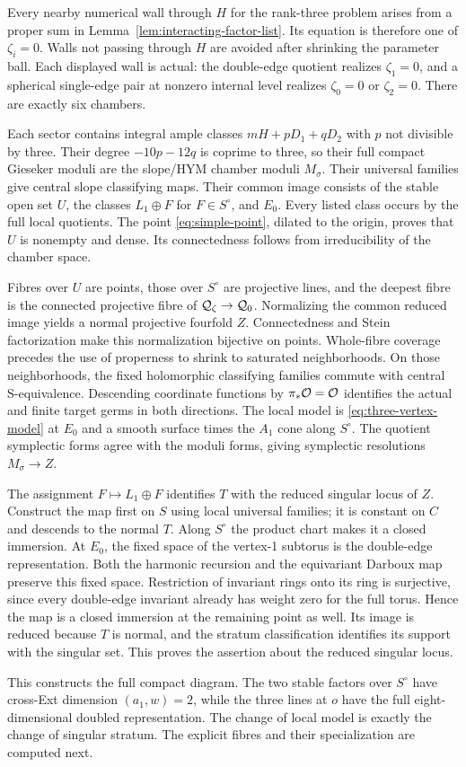 Every nearby numerical wall through $H$ for
the rank-three problem arises from a proper
sum in Lemma~\ref{lem:interacting-factor-list}.
Its equation is therefore one of
$\zeta_i=0$. Walls not passing through $H$
are avoided after shrinking the parameter
ball. Each displayed wall is actual: the
double-edge quotient realizes $\zeta_1=0$,
and a spherical single-edge pair at nonzero
internal level realizes $\zeta_0=0$ or
$\zeta_2=0$. There are exactly six chambers.

Each sector contains integral ample classes
$mH+pD_1+qD_2$ with $p$ not divisible by
three. Their degree $-10p-12q$ is coprime
to three, so their full compact Gieseker
moduli are the slope/HYM chamber moduli
$M_\sigma$. Their universal families give
central slope classifying maps. Their common
image consists of the stable open set $U$,
the classes $L_1\oplus F$ for
$F\in S^\circ$, and $E_0$. Every listed
class occurs by the full local quotients.
The point \eqref{eq:simple-point}, dilated
to the origin, proves that $U$ is nonempty
and dense. Its connectedness follows from
irreducibility of the chamber space.

Fibres over $U$ are points, those over
$S^\circ$ are projective lines, and the
deepest fibre is the connected projective
fibre of $\mathcal Q_\zeta\to\mathcal Q_0$. Normalizing
the common reduced image yields a normal
projective fourfold $Z$. Connectedness and
Stein factorization make this normalization
bijective on points. Whole-fibre coverage
precedes the use of properness to shrink to
saturated neighborhoods. On those neighborhoods,
the fixed holomorphic classifying families
commute with central S-equivalence. Descending
coordinate functions by $\pi_*\mathcal O=\mathcal O$
identifies the actual and finite target
germs in both directions. The local model
is \eqref{eq:three-vertex-model} at $E_0$
and a smooth surface times the $A_1$ cone
along $S^\circ$. The quotient symplectic
forms agree with the moduli forms, giving
symplectic resolutions $M_\sigma\to Z$.

The assignment $F\mapsto L_1\oplus F$
identifies $T$ with the reduced singular
locus of $Z$. Construct the map first on $S$
using local universal families; it is
constant on $C$ and descends to the normal
$T$. Along $S^\circ$ the product chart
makes it a closed immersion. At $E_0$, the
fixed space of the vertex-1 subtorus is
the double-edge representation. Both the
harmonic recursion and the equivariant
Darboux map preserve this fixed space.
Restriction of invariant rings onto its
ring is surjective, since every double-edge
invariant already has weight zero for the
full torus. Hence the map is a closed
immersion at the remaining point as well.
Its image is reduced because $T$ is normal,
and the stratum classification identifies
its support with the singular set. This
proves the assertion about the reduced
singular locus.

This constructs the full compact diagram.
The two stable factors over $S^\circ$
have cross-Ext dimension $(a_1,w)=2$, while
the three lines at $o$ have the full
eight-dimensional doubled representation.
The change of local model is exactly the
change of singular stratum. The explicit
fibres and their specialization are
computed next.

